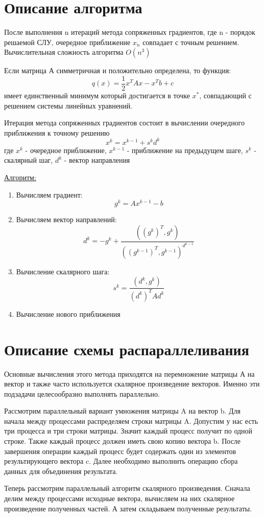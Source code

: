 \documentclass{report}
\begin{document}
\section*{Описание алгоритма}
\par После выполнения n итераций метода сопряженных градиентов, где n - порядок решаемой СЛУ, очередное приближение $x_n$ совпадает с точным решением. Вычислительная сложность алгоритма $O(n^3)$
\par Если матрица А симметричная и положительно определена, то функция:
$$q(x)=\frac{1}{2}x^TAx - x^Tb + c$$
имеет единственный минимум который достигается в точке $x^*$, совпадающий с решением системы линейных уравнений.
\par Итерация метода сопряженных градиентов состоит в вычислении очередного приближения к точному решению
$$x^k = x^{k-1} + s^kd^k$$
где $x^k$ - очередное приближение, $x^{k-1}$ - приближение на предыдущем шаге, $s^k$ - скалярный шаг, $d^k$ - вектор направления
\par\par \underline{Алгоритм:}
\begin{enumerate} 
	\item Вычисляем градиент: $$g^k = Ax^{k-1} - b$$
	\item Вычисляем вектор направлений: $$d^k = -g^k + \frac{((g^k)^T, g^k)}{((g^{k-1})^T, g^{k-1})^{d^{k-1}}}$$
	\item Вычисление скалярного шага: $$s^k = \frac{(d^k, g^k)}{(d^k)^TAd^k}$$
	\item Вычисление нового приближения
\end{enumerate}
\newpage

\section*{Описание схемы распараллеливания}
\par Основные вычисления этого метода приходятся на перемножение матрицы А на вектор и также часто используется скалярное произведение векторов. Именно эти подзадачи целесообразно выполнять параллельно. 
\par Рассмотрим параллельный вариант умножения матрицы A на вектор b. Для начала между процессами распределяем строки матрицы A. Допустим у нас есть три процесса и три строки матрицы. Значит каждый процесс получит по одной строке. Также каждый процесс должен иметь свою копию вектора b. После завершения операции каждый процесс будет содержать один из элементов результирующего вектора c. Далее необходимо выполнить операцию сбора данных для объединения результата. 
\par Теперь рассмотрим параллельный алгоритм скалярного произведения. Сначала делим между процессами исходные вектора, вычисляем на них скалярное произведение полученных частей. А затем складываем полученные результаты.
\newpage
\end{document}

